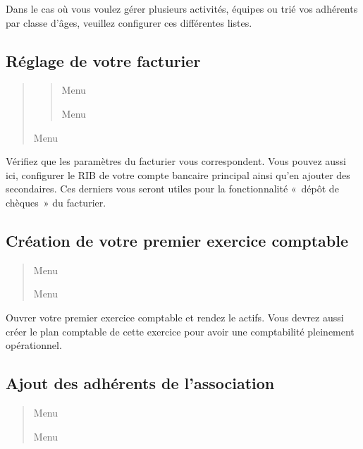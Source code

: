 \documentclass[a4paper,10pt,oneside,french]{sphinxmanual}
\begin{document}
Dans le cas où vous voulez gérer plusieurs activités, équipes ou trié vos adhérents par classe d’âges, veuillez configurer ces différentes listes.


\subsection{Réglage de votre facturier}
\label{\detokenize{asso/first_step:reglage-de-votre-facturier}}\begin{quote}
\begin{quote}

Menu 

Menu 
\end{quote}

Menu 
\end{quote}

Vérifiez que les paramètres du facturier vous correspondent.
Vous pouvez aussi ici, configurer le RIB de votre compte bancaire principal ainsi qu’en ajouter des secondaires.
Ces derniers vous seront utiles pour la fonctionnalité « dépôt de chèques » du facturier.


\subsection{Création de votre premier exercice comptable}
\label{\detokenize{asso/first_step:creation-de-votre-premier-exercice-comptable}}\begin{quote}

Menu 

Menu 
\end{quote}

Ouvrer votre premier exercice comptable et rendez le actifs.
Vous devrez aussi créer le plan comptable de cette exercice pour avoir une comptabilité pleinement opérationnel.


\subsection{Ajout des adhérents de l’association}
\label{\detokenize{asso/first_step:ajout-des-adherents-de-l-association}}\begin{quote}

Menu 

Menu 
\end{quote}
\end{document}
